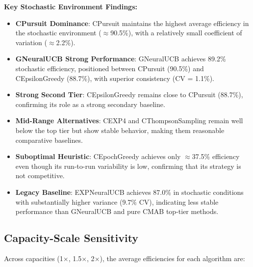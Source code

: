 \documentclass[12pt,a4paper]{article}
\newcommand{\stochastic}[1]{\textcolor{stochasticcolor}{\textbf{#1}}}
\newcommand{\critical}[1]{\textcolor{criticalcolor}{\textbf{#1}}}
\newcommand{\legacy}[1]{\textcolor{legacycolor}{\textbf{#1}}}
\newcommand{\neural}[1]{\textcolor{neuralcolor}{\textbf{#1}}}
\begin{document}
\begin{tcolorbox}[colback=stochasticcolor!10,colframe=stochasticcolor,title=\textbf{Stochastic Environment Deep Analysis (1$\times$–2$\times$ Capacities, T/Tb Combined)}]
\textbf{Key Stochastic Environment Findings:}
\begin{itemize}
\item \stochastic{CPursuit Dominance}: CPursuit maintains the highest average efficiency in the stochastic environment ($\approx$90.5\%), with a relatively small coefficient of variation ($\approx$2.2\%).
\item \neural{GNeuralUCB Strong Performance}: GNeuralUCB achieves 89.2\% stochastic efficiency, positioned between CPursuit (90.5\%) and CEpsilonGreedy (88.7\%), with superior consistency (CV = 1.1\%).
\item \stochastic{Strong Second Tier}: CEpsilonGreedy remains close to CPursuit (88.7\%), confirming its role as a strong secondary baseline.
\item \stochastic{Mid-Range Alternatives}: CEXP4 and CThompsonSampling remain well below the top tier but show stable behavior, making them reasonable comparative baselines.
\item \critical{Suboptimal Heuristic}: CEpochGreedy achieves only $\approx$37.5\% efficiency even though its run-to-run variability is low, confirming that its strategy is not competitive.
\item \legacy{Legacy Baseline}: EXPNeuralUCB achieves 87.0\% in stochastic conditions with substantially higher variance (9.7\% CV), indicating less stable performance than GNeuralUCB and pure CMAB top-tier methods.
\end{itemize}

\end{tcolorbox}

\subsection{Capacity-Scale Sensitivity}

Across capacities (1$\times$, 1.5$\times$, 2$\times$), the average efficiencies for each algorithm are:
\end{document}
